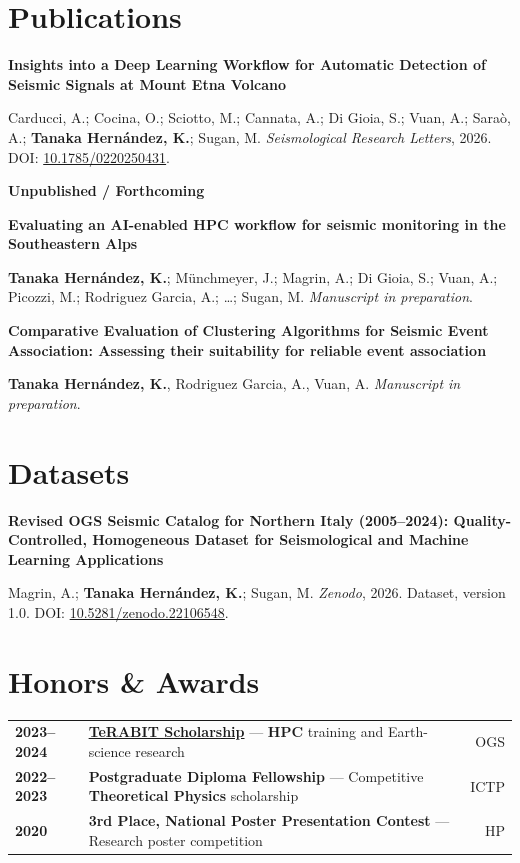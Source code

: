 \documentclass[10pt,a4paper]{article}
\newcommand{\cvproject}[2]{%
  \vspace{2pt}%
  {\bfseries\color{ink}#1}\par
  \smallskip
  {\color{muted}#2}\par
}
\begin{document}
\section*{Publications}
\cvproject{Insights into a Deep Learning Workflow for Automatic
Detection of Seismic Signals at Mount Etna Volcano}{Carducci, A.;
  Cocina, O.; Sciotto, M.; Cannata, A.; Di Gioia, S.; Vuan, A.; Saraò,
  A.; \textbf{Tanaka Hernández, K.}; Sugan, M. \textit{Seismological
  Research Letters}, 2026. DOI:
\href{https://doi.org/10.1785/0220250431}{10.1785/0220250431}.}

\par\vspace{2pt}
\begin{center}\textbf{\color{accent}Unpublished / Forthcoming}
\end{center}

\cvproject{Evaluating an AI-enabled HPC workflow for seismic
monitoring in the Southeastern Alps}{\textbf{Tanaka Hernández, K.};
  Münchmeyer, J.; Magrin, A.; Di Gioia, S.; Vuan, A.; Picozzi, M.;
Rodriguez Garcia, A.; \ldots; Sugan, M. \textit{Manuscript in preparation}.}

\cvproject{Comparative Evaluation of Clustering Algorithms for
  Seismic Event Association: Assessing their suitability for reliable
event association}{\textbf{Tanaka Hernández, K.}, Rodriguez Garcia,
A., Vuan, A. \textit{Manuscript in preparation}.}

\section*{Datasets}
\cvproject{Revised OGS Seismic Catalog for Northern Italy (2005--2024):
  Quality-Controlled, Homogeneous Dataset for Seismological and Machine
Learning Applications}{Magrin, A.; \textbf{Tanaka Hernández, K.}; Sugan, M.
  \textit{Zenodo}, 2026. Dataset, version 1.0. DOI:
\href{https://doi.org/10.5281/zenodo.22106548}{10.5281/zenodo.22106548}.}

\section*{Honors \& Awards}
\begin{tabularx}{\textwidth}{@{}p{0.9in}Xr@{}}
  \textbf{\color{accent}2023--2024} &
  \textbf{\href{https://www.terabit-project.it/en/}{TeRABIT
  Scholarship}} --- \textbf{HPC} training and Earth-science research
  & \textcolor{muted}{OGS}\\[3pt]
  \textbf{\color{accent}2022--2023} & \textbf{Postgraduate Diploma
  Fellowship} --- Competitive \textbf{Theoretical Physics}
  scholarship & \textcolor{muted}{ICTP}\\[3pt]
  \textbf{\color{accent}2020} & \textbf{3rd Place, National Poster
  Presentation Contest} --- Research poster competition &
  \textcolor{muted}{HP}\\[3pt]
\end{tabularx}
\end{document}
